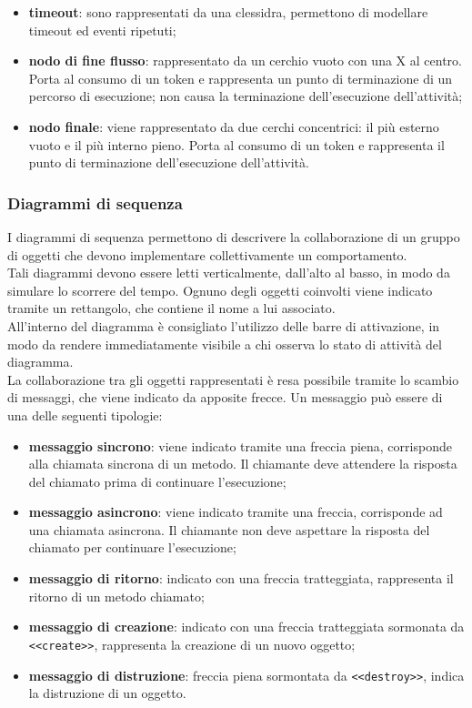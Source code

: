 \begin{itemize}
     		\item{\textbf{timeout}}: sono rappresentati da una clessidra, permettono di modellare timeout ed eventi ripetuti;
     		\item{\textbf{nodo di fine flusso}}: rappresentato da un cerchio vuoto con una X al centro. Porta al consumo di un token e rappresenta un punto di terminazione di un percorso di esecuzione; non causa la terminazione dell'esecuzione dell'attività; 
     		\item{\textbf{nodo finale}}: viene rappresentato da due cerchi concentrici: il più esterno vuoto e il più interno pieno. Porta al consumo di un token e rappresenta il punto di terminazione dell'esecuzione dell'attività. 
     	\end{itemize}
     	
     	\subsubsection*{Diagrammi di sequenza}
     	I diagrammi di sequenza permettono di descrivere la collaborazione di un gruppo di oggetti che devono implementare collettivamente un comportamento. \\
     	Tali diagrammi devono essere letti verticalmente, dall'alto al basso, in modo da simulare lo scorrere del tempo. Ognuno degli oggetti coinvolti viene indicato tramite un rettangolo, che contiene il nome a lui associato. \\  
     	All'interno del diagramma è consigliato l'utilizzo delle barre di attivazione, in modo da rendere immediatamente visibile a chi osserva lo stato di attività del diagramma. 	\\ 
     	La collaborazione tra gli oggetti rappresentati è resa possibile tramite lo scambio di messaggi, che viene indicato da apposite frecce. Un messaggio può essere di una delle seguenti tipologie: 
     	\begin{itemize}
     		\item{\textbf{messaggio sincrono}}: viene indicato tramite una freccia piena, corrisponde alla chiamata sincrona di un metodo. Il chiamante deve attendere la risposta del chiamato prima di continuare l'esecuzione;
     		\item{\textbf{messaggio asincrono}}: viene indicato tramite una freccia, corrisponde ad una chiamata asincrona. Il chiamante non deve aspettare la risposta del chiamato per continuare l'esecuzione;
     		\item{\textbf{messaggio di ritorno}}: indicato con una freccia tratteggiata, rappresenta il ritorno di un metodo chiamato; 
     		\item{\textbf{messaggio di creazione}}: indicato con una freccia tratteggiata sormonata da \texttt{<<create>>}, rappresenta la creazione di un nuovo oggetto;
     		\item{\textbf{messaggio di distruzione}}: freccia piena sormontata da \texttt{<<destroy>>}, indica la distruzione di un oggetto.
     	\end{itemize}
     
